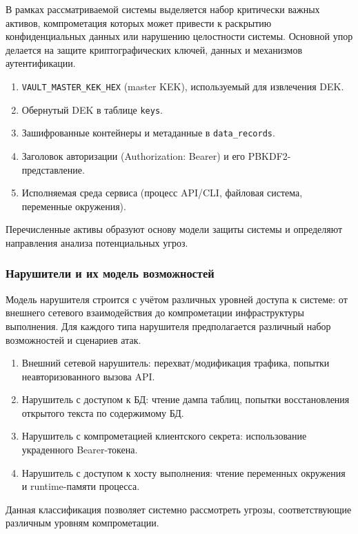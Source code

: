 \documentclass[14pt, a4paper]{extarticle}
\begin{document}
	В рамках рассматриваемой системы выделяется набор критически важных активов, компрометация которых может привести к раскрытию конфиденциальных данных или нарушению целостности системы. Основной упор делается на защите криптографических ключей, данных и механизмов аутентификации.
	
	\begin{enumerate}
	\item \texttt{VAULT\_MASTER\_KEK\_HEX} (master KEK), используемый для извлечения DEK.
	\item Обернутый DEK в таблице \texttt{keys}.
	\item Зашифрованные контейнеры и метаданные в \texttt{data\_records}.
	\item Заголовок авторизации (Authorization: Bearer) и его PBKDF2-представление.
	\item Исполняемая среда сервиса (процесс API/CLI, файловая система, переменные окружения).
	\end{enumerate}
	
	Перечисленные активы образуют основу модели защиты системы и определяют направления анализа потенциальных угроз.
		
	\subsubsection{Нарушители и их модель возможностей}
	
	Модель нарушителя строится с учётом различных уровней доступа к системе: от внешнего сетевого взаимодействия до компрометации инфраструктуры выполнения. Для каждого типа нарушителя предполагается различный набор возможностей и сценариев атак.
	
	\begin{enumerate}
	\item Внешний сетевой нарушитель: перехват/модификация трафика, попытки неавторизованного вызова API.
	\item Нарушитель с доступом к БД: чтение дампа таблиц, попытки восстановления открытого текста по содержимому БД.
	\item Нарушитель с компрометацией клиентского секрета: использование украденного Bearer-токена.
	\item Нарушитель с доступом к хосту выполнения: чтение переменных окружения и runtime-памяти процесса.
	\end{enumerate}
	
	Данная классификация позволяет системно рассмотреть угрозы, соответствующие различным уровням компрометации.
		
\end{document}
